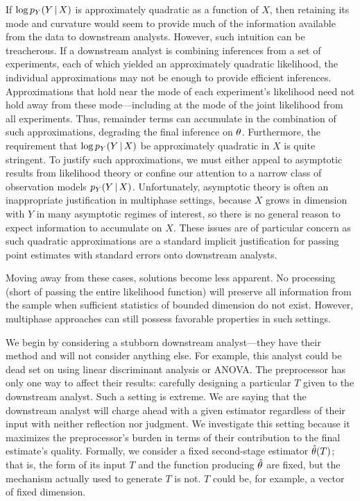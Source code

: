 If $\log p_Y(Y \, | \, X)$ is approximately quadratic as a function of $X$, then retaining its mode and curvature would seem to provide much of the information available from the data to downstream analysts.
However, such intuition can be treacherous.
If a downstream analyst is combining inferences from a set of experiments, each of which yielded an approximately quadratic likelihood, the individual approximations may not be enough to provide efficient inferences.
Approximations that hold near the mode of each experiment's likelihood need not hold away from these mode---including at the mode of the joint likelihood from all experiments.
Thus, remainder terms can accumulate in the combination of such approximations, degrading the final inference on $\theta$.
Furthermore, the requirement that $\log p_Y(Y \, | \, X)$ be approximately quadratic in $X$ is quite stringent.
To justify such approximations, we must either appeal to asymptotic results from likelihood theory or confine our attention to a narrow class of observation models $p_Y(Y \, | \, X)$.
Unfortunately, asymptotic theory is often an inappropriate justification in multiphase settings, because 
$X$ grows in dimension with $Y$ in many asymptotic regimes of interest, so there is no general reason to expect information to accumulate on $X$.
These issues are of particular concern as such quadratic approximations are a standard implicit justification for passing point estimates with standard errors onto downstream analysts.

Moving away from these cases, solutions become less apparent.
No processing (short of passing the entire likelihood function) will preserve all information from the sample when sufficient statistics of bounded dimension do not exist.
However, multiphase approaches can still possess favorable properties in such settings.

We begin by considering a stubborn downstream analyst---they have their method and will not consider anything else.
For example, this analyst could be dead set on using linear discriminant analysis or ANOVA.
The preprocessor has only one way to affect their results: carefully designing a particular $T$ given to the downstream analyst.
Such a setting is extreme.
We are saying that the downstream analyst will charge ahead with a given estimator regardless of their input with neither reflection nor judgment.
We investigate this setting because it maximizes the preprocessor's burden in terms of their contribution to the final estimate's quality.
Formally, we consider a fixed second-stage estimator $\hat{\theta}(T)$; that is, the form of its input $T$ and the function producing $\hat{\theta}$ are fixed, but the mechanism actually used to generate $T$ is not.
$T$ could be, for example, a vector of fixed dimension.

